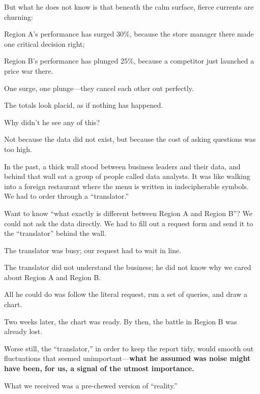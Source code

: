 But what he does not know is that beneath the calm surface, fierce currents are churning:

Region A's performance has surged 30\%, because the store manager there made one critical decision right;

Region B's performance has plunged 25\%, because a competitor just launched a price war there.

\vspace{1em}

One surge, one plunge---they cancel each other out perfectly.

The totals look placid, as if nothing has happened.

Why didn't he see any of this?

Not because the data did not exist, but because the cost of asking questions was too high.

\vspace{1em}

In the past, a thick wall stood between business leaders and their data, and behind that wall sat a group of people called data analysts.
It was like walking into a foreign restaurant where the menu is written in indecipherable symbols. We had to order through a ``translator.''

\vspace{1em}

Want to know ``what exactly is different between Region A and Region B''? We could not ask the data directly. We had to fill out a request form and send it to the ``translator'' behind the wall.

The translator was busy; our request had to wait in line.

The translator did not understand the business; he did not know why we cared about Region A and Region B.

All he could do was follow the literal request, run a set of queries, and draw a chart.

Two weeks later, the chart was ready. By then, the battle in Region B was already lost.

Worse still, the ``translator,'' in order to keep the report tidy, would smooth out fluctuations that seemed unimportant---\textbf{what he assumed was noise might have been, for us, a signal of the utmost importance.}

\vspace{1em}

What we received was a pre-chewed version of ``reality.''


